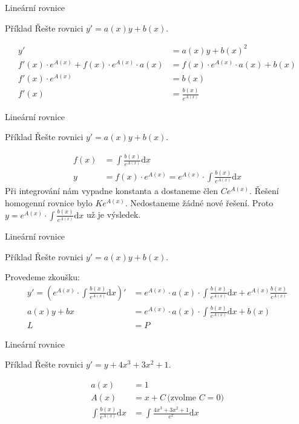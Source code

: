 \documentclass{beamer}
\theoremstyle{definition}
\theoremstyle{example}
\def\d{\mathrm{d}}
\begin{document}
\begin{frame}{Lineární rovnice}
	\begin{exampleblock}{Příklad}
		Řešte rovnici $y' = a(x)y + b(x)$.
	\end{exampleblock}
	\begin{align*}
		y' &= a(x)y + b(x)^2\\
		f'(x)\cdot e^{A(x)} + f(x)\cdot e^{A(x)} \cdot a(x) &= f(x)\cdot e^{A(x)} \cdot a(x) + b(x)\\
		f'(x)\cdot e^{A(x)} &= b(x)\\
		f'(x) &=\frac{b(x)}{e^{A(x)}}
	\end{align*}
\end{frame}
\begin{frame}{Lineární rovnice}
	\begin{exampleblock}{Příklad}
		Řešte rovnici $y' = a(x)y + b(x)$.
	\end{exampleblock}
	\begin{align*}
		f(x) &=\int\frac{b(x)}{e^{A(x)}} \d x\\
		y &= f(x)\cdot e^{A(x)} = e^{A(x)} \cdot \int\frac{b(x)}{e^{A(x)}} \d x
	\end{align*}
	Při integrování nám vypadne konstanta a dostaneme člen $Ce^{A(x)}$. Řešení homogenní rovnice bylo $Ke^{A(x)}$. Nedostaneme žádné nové řešení. Proto $y = e^{A(x)} \cdot \int\frac{b(x)}{e^{A(x)}} \d x$ už je výsledek.
\end{frame}

\begin{frame}{Lineární rovnice}
	\begin{exampleblock}{Příklad}
		Řešte rovnici $y' = a(x)y + b(x)$.
	\end{exampleblock}
	Provedeme zkoušku:
	\begin{align*}
		y' = \left(e^{A(x)} \cdot \int\frac{b(x)}{e^{A(x)}} \d x\right)' &= e^{A(x)} \cdot a(x) \cdot \int\frac{b(x)}{e^{A(x)}} \d x + e^{A(x)} \frac{b(x)}{e^{A(x)}}\\
		a(x)y + bx &=  e^{A(x)} \cdot a(x) \cdot \int \frac{b(x)}{e^{A(x)}} \d x + b(x)\\
		L &= P
	\end{align*}
\end{frame}

\begin{frame}{Lineární rovnice}
	\begin{exampleblock}{Příklad}
		Řešte rovnici $y' = y + 4x^3 + 3x^2 + 1$.
	\end{exampleblock}
	\begin{align*}
		a(x) &= 1\\
		A(x) &= x + C\, \text{(zvolme $C = 0$)}\\
		\int \frac{b(x)}{e^{A(x)}} \d x &= \int \frac{4x^3 + 3x^2 + 1}{e^x} \d x
	\end{align*}
\end{frame}
\end{document}
